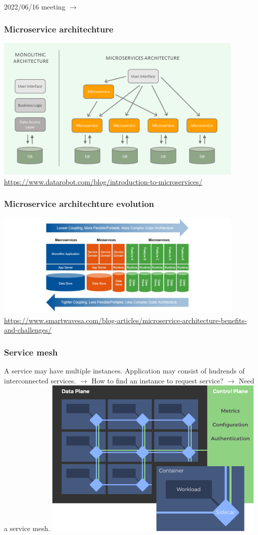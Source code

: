 \documentclass{beamer}
\begin{document}
\begin{frame}
  \Large{2022/06/16 meeting $\rightarrow$}
\end{frame}

\begin{frame}
  \frametitle{Microservice architechture}
  \center
  \includegraphics[width=0.9\textwidth]{images/microservice-arch}
  \tiny{\url{https://www.datarobot.com/blog/introduction-to-microservices/}}
\end{frame}


\begin{frame}
  \frametitle{Microservice architechture evolution}
  \center
  \includegraphics[width=0.9\textwidth]{images/microservice-evolution}
  \tiny{\url{https://www.smartwavesa.com/blog-articles/microservice-architecture-benefits-and-challenges/}}
\end{frame}

\begin{frame}
  \frametitle{Service mesh}
    A service may have multiple instances. Application may consist of hudrends of interconnected services. $\rightarrow$  How to find an instance to request service? $\rightarrow$ Need a service mesh.
    \center
  \includegraphics[width=0.8\textwidth]{images/service-mesh}
\end{frame}
\end{document}
